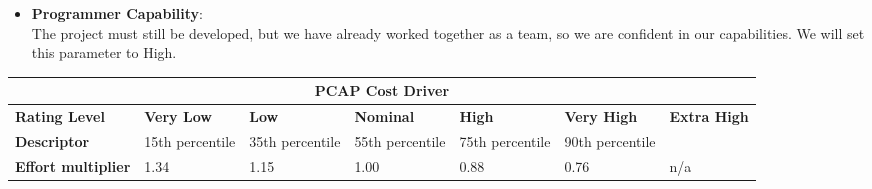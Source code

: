 \begin{itemize}
\item \textbf{Programmer Capability}:\\
The project must still be developed, but we have already worked together as a team, so we are confident in our capabilities. We will set this parameter to High.
\end{itemize}
\hspace*{-3cm}\begin{tabular}{|p{3cm}|p{2cm}|p{2cm}|p{2cm}|p{2cm}|p{2cm}|p{2cm}|}
\hline
\multicolumn{7}{|c|}{\textbf{PCAP Cost Driver}}\\
\hline
\hline
\textbf{Rating Level} & \textbf{Very Low} & \textbf{Low} & \textbf{Nominal} & \textbf{High} & \textbf{Very High} & \textbf{Extra High}\\
\hline
\textbf{Descriptor} & 15th percentile & 35th percentile & 55th percentile & 75th percentile & 90th percentile & \\
\hline
\textbf{Effort multiplier} & 1.34 & 1.15 & 1.00 & 0.88 & 0.76 & n/a\\
\hline 
\end{tabular}
